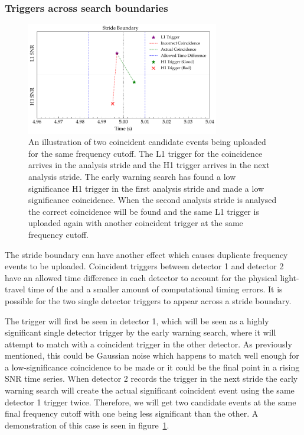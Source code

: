 \subsubsection{\label{6:sec:trigs-across-bounds}Triggers across search boundaries}
%
\begin{figure}
       \centering
    \includegraphics[width=0.75\textwidth]{images/6_earlywarning/identified-problems/trigs_across_bounds.pdf}
    \caption{An illustration of two coincident candidate events being uploaded for the same frequency cutoff. The L1 trigger for the coincidence arrives in the analysis stride and the H1 trigger arrives in the next analysis stride. The early warning search has found a low significance H1 trigger in the first analysis stride and made a low significance coincidence. When the second analysis stride is analysed the correct coincidence will be found and the same L1 trigger is uploaded again with another coincident trigger at the same frequency cutoff.}
    \label{6:fig:triggers_across_boundaries}
\end{figure}
%
The stride boundary can have another effect which causes duplicate frequency events to be uploaded. Coincident triggers between detector 1 and detector 2 have an allowed time difference in each detector to account for the physical light-travel time of the \gw and a smaller amount of computational timing errors. It is possible for the two single detector triggers to appear across a stride boundary.

The trigger will first be seen in detector 1, which will be seen as a highly significant single detector trigger by the early warning search, where it will attempt to match with a coincident trigger in the other detector. As previously mentioned, this could be Gaussian noise which happens to match well enough for a low-significance coincidence to be made or it could be the final point in a rising SNR time series. When detector 2 records the trigger in the next stride the early warning search will create the actual significant coincident event using the same detector 1 trigger twice. Therefore, we will get two candidate events at the same final frequency cutoff with one being less significant than the other. A demonstration of this case is seen in figure~\ref{6:fig:triggers_across_boundaries}.

